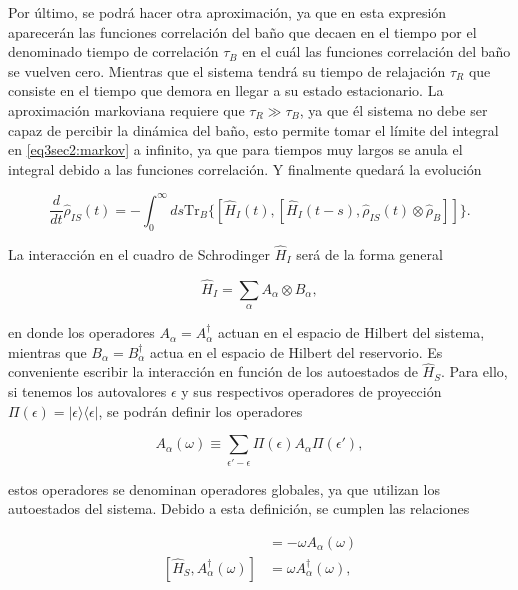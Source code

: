 Por último, se podrá hacer otra aproximación, ya que en esta expresión aparecerán las funciones correlación del baño que decaen en el tiempo por el denominado tiempo de correlación $\tau_{B}$ en el cuál las funciones correlación del baño se vuelven cero. Mientras que el sistema tendrá su tiempo de relajación $\tau_{R}$ que consiste en el tiempo que demora en llegar a su estado estacionario. La aproximación markoviana requiere que $\tau_{R}\gg \tau_{B}$, ya que él sistema no debe ser capaz de percibir la dinámica del baño, esto permite tomar el límite del integral en \ref{eq3sec2:markov} a infinito, ya que para tiempos muy largos se anula el integral debido a las funciones correlación. Y finalmente quedará la evolución

\begin{equation}
    \frac{d}{dt}\hat{\rho}_{IS}(t) = -  \int_{0}^{\infty}ds \text{Tr}_{B}\{[\hat{H}_{I}(t), [\hat{H}_{I}(t-s),\hat{\rho}_{IS}(t) \otimes \hat{\rho}_{B}]]\}.
    \label{eq3sec2:markov1}
\end{equation} 

La interacción en el cuadro de Schrodinger $\hat{H}_{I}$ será de la forma general

\begin{equation*}
    \hat{H}_{I} = \sum_{\alpha}A_{\alpha} \otimes B_{\alpha},
\end{equation*}

en donde los operadores $A_{\alpha} = A^{\dagger}_{\alpha}$ actuan en el espacio de Hilbert del sistema, mientras que $B_{\alpha}=B^{\dagger}_{\alpha}$ actua en el espacio de Hilbert del reservorio. Es conveniente escribir la interacción en función de los autoestados de $\hat{H}_{S}$. Para ello, si tenemos los autovalores $\epsilon$ y sus respectivos operadores de proyección $\Pi(\epsilon) = |\epsilon\rangle \langle \epsilon|$, se podrán definir los operadores

\begin{equation*}
    A_{\alpha}(\omega) \equiv \sum_{\epsilon' - \epsilon}\Pi(\epsilon)A_{\alpha}\Pi(\epsilon'), 
\end{equation*}

estos operadores se denominan operadores globales, ya que utilizan los autoestados del sistema. Debido a esta definición, se cumplen las relaciones

\begin{align*}
    [\hat{H}_{S},A_{\alpha}(\omega)] & = - \omega A_{\alpha}(\omega) \\
    [\hat{H}_{S},A^{\dagger}_{\alpha}(\omega)] & = \omega A^{\dagger}_{\alpha}(\omega),
\end{align*}

